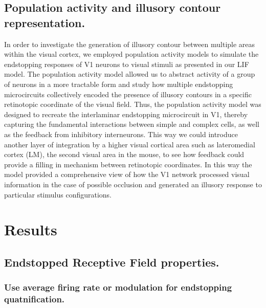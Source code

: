 \documentclass[12pt]{article}
\begin{document}
\subsection{Population activity and illusory contour representation.}
In order to investigate the generation of illusory contour between multiple areas within the visual cortex, we employed population activity models to simulate the endstopping responses of V1 neurons to visual stimuli as presented in our LIF model. The population activity model allowed us to abstract activity of a group of neurons in a more tractable form and study how multiple endstopping microcircuits collectively encoded the presence of illusory contours in a specific retinotopic coordinate of the visual field. Thus, the population activity model was designed to recreate the interlaminar endstopping microcircuit in V1, thereby capturing the fundamental interactions between simple and complex cells, as well as the feedback from inhibitory interneurons. This way we could introduce another layer of integration by a higher visual cortical area such as lateromedial cortex (LM), the second visual area in the mouse, to see how feedback could provide a filling in mechanism between retinotopic coordinates. In this way the model provided a comprehensive view of how the V1 network processed visual information in the case of possible occlusion and generated an illusory response to particular stimulus configurations.





\section{Results}
\subsection{Endstopped Receptive Field properties.}

  \subsubsection{Use average firing rate or modulation for endstopping quatnification.}
\end{document}
